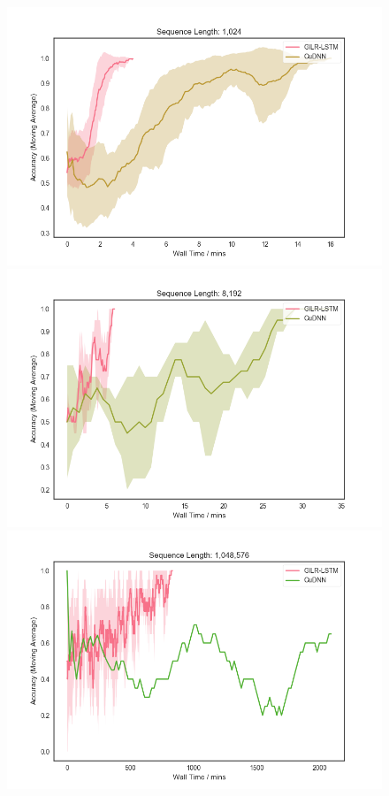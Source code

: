 \documentclass{article}
\begin{document}
\begin{figure}
  \centering
  \begin{minipage}{0.5\textwidth}
    \includegraphics[width=1.0\textwidth]{1k_20_smoothing.png}
  \end{minipage}%
    \begin{minipage}{0.5\textwidth}
    \includegraphics[width=1.0\textwidth]{8k_5_smoothing.png}
  \end{minipage}
  \begin{minipage}{0.5\textwidth}
    \includegraphics[width=1.0\textwidth]{1m_20_smoothing.png}

\end{minipage}
\end{figure}
\end{document}
